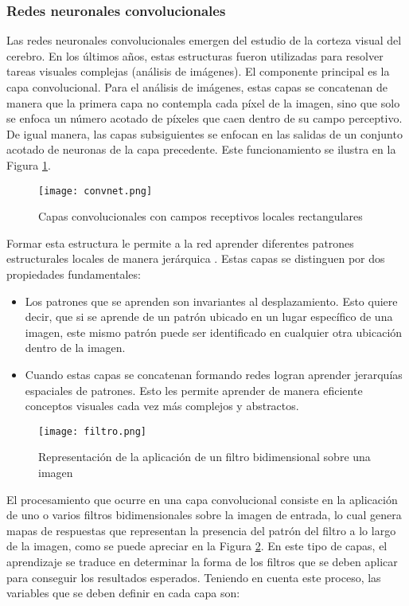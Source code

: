 \subsubsection{Redes neuronales convolucionales}

Las redes neuronales convolucionales emergen del estudio de la corteza visual del cerebro. En los últimos años, estas estructuras fueron utilizadas para resolver tareas visuales complejas (análisis de imágenes). El componente principal es la capa convolucional. Para el análisis de imágenes, estas capas se concatenan de manera que la primera capa no contempla cada píxel de la imagen, sino que solo se enfoca un número acotado de píxeles que caen dentro de su campo perceptivo. De igual manera, las capas subsiguientes se enfocan en las salidas de un conjunto acotado de neuronas de la capa precedente. Este funcionamiento se ilustra en la Figura \ref{fig:convnet}. 

\begin{figure}[H]
  \centering{}
  \texttt{[image: convnet.png]}
  \caption{Capas convolucionales con campos receptivos locales rectangulares}
  \label{fig:convnet}
\end{figure}

Formar esta estructura le permite a la red aprender diferentes patrones estructurales locales de manera jerárquica \cite{lagartija}. Estas capas se distinguen por dos propiedades fundamentales: 

\begin{itemize}
\item Los patrones que se aprenden son invariantes al desplazamiento. Esto quiere decir, que si se aprende de un patrón ubicado en un lugar específico de una imagen, este mismo patrón puede ser identificado en cualquier otra ubicación dentro de la imagen. 

\item Cuando estas capas se concatenan formando redes logran aprender jerarquías espaciales de patrones. Esto les permite aprender de manera eficiente conceptos visuales cada vez más complejos y abstractos. 
\end{itemize}

\begin{figure}[H]
  \centering{}
  \texttt{[image: filtro.png]}
  \caption{Representación de la aplicación de un filtro bidimensional sobre una imagen}
  \label{fig:numerito}
\end{figure}

El procesamiento que ocurre en una capa convolucional consiste en la aplicación de uno o varios filtros bidimensionales sobre la imagen de entrada, lo cual genera mapas de respuestas que representan la presencia del patrón del filtro a lo largo de la imagen, como se puede apreciar en la Figura \ref{fig:numerito}. En este tipo de capas, el aprendizaje se traduce en determinar la forma de los filtros que se deben aplicar para conseguir los resultados esperados. Teniendo en cuenta este proceso, las variables que se deben definir en cada capa son: 

